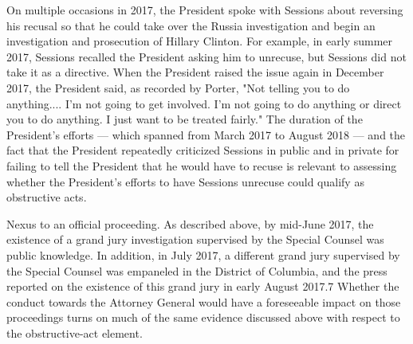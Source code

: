 On multiple occasions in 2017, the President spoke with Sessions about reversing his recusal so that he could take over the Russia investigation and begin an investigation and prosecution of Hillary Clinton.
For example, in early summer 2017, Sessions recalled the President asking him to unrecuse, but Sessions did not take it as a directive.
When the President raised the issue again in December 2017, the President said, as recorded by Porter, "Not telling you to do anything....
I'm not going to get involved.
I'm not going to do anything or direct you to do anything.
I just want to be treated fairly."
The duration of the President's efforts — which spanned from March 2017 to August 2018 — and the fact that the President repeatedly criticized Sessions in public and in private for failing to tell the President that he would have to recuse is relevant to assessing whether the President's efforts to have Sessions unrecuse could qualify as obstructive acts.

Nexus to an official proceeding.
As described above, by mid-June 2017, the existence of a grand jury investigation supervised by the Special Counsel was public knowledge.
In addition, in July 2017, a different grand jury supervised by the Special Counsel was empaneled in the District of Columbia, and the press reported on the existence of this grand jury in early August 2017.7
Whether the conduct towards the Attorney General would have a foreseeable impact on those proceedings turns on much of the same evidence discussed above with respect to the obstructive-act element.

